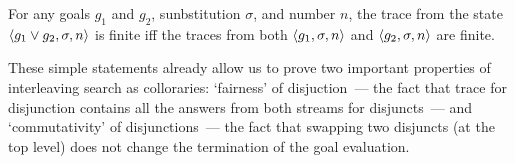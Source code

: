 \begin{lemma}
\label{lem:disj_termination}
For any goals $g_1$ and $g_2$, sunbstitution $\sigma$, and number $n$, the trace from the state $\left<{g_1 \vee g_2, \sigma, n}\right>$ is finite iff the traces from both $\left<{g_1, \sigma, n}\right>$ and $\left<{g_2, \sigma, n}\right>$ are finite.
\end{lemma}

These simple statements already allow us to prove two important properties of interleaving search as colloraries: `fairness' of disjuction~--- the fact that trace for disjunction contains all the answers from both streams for disjuncts~--- and `commutativity' of disjunctions~--- the fact that swapping two disjuncts (at the top level) does not change the termination of the goal evaluation. 
